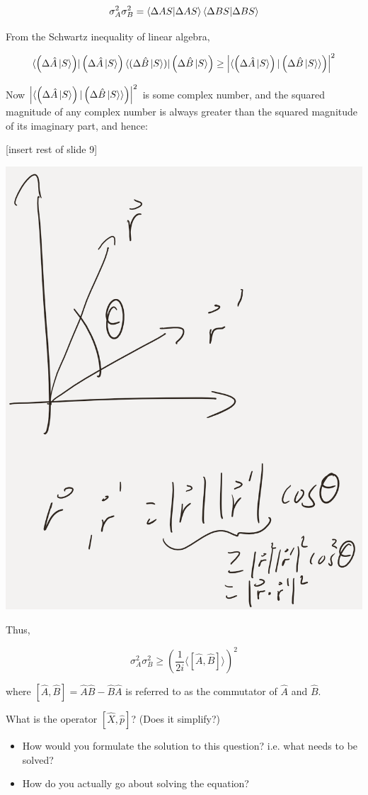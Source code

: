 \documentclass{article}
\begin{document}
$$\sigma_A^2 \sigma_B^2 = \braket{\Delta AS|\Delta AS} \braket{\Delta BS| \Delta BS}$$

From the Schwartz inequality of linear algebra, 

$$\bra{\left( \Delta \hat{A} \ket{S} \right)} \left( \Delta \hat{A} \ket{S} \right) \bra{(\Delta \hat{B} \ket{S})} \left( \Delta \hat{B} \ket{S} \right) \geq \left| \langle \left( \Delta \hat{A} \ket{S} \right) | \left( \Delta \hat{B} \ket{S} \rangle \right)  \right|^2$$

Now $\left| \langle \left( \Delta \hat{A} \ket{S} \right) | \left( \Delta \hat{B} \ket{S} \rangle \right)  \right|^2$ is some complex number, and the squared magnitude of any complex number is always greater than the squared magnitude of its imaginary part, and hence:

[insert rest of slide 9]

\includegraphics[width = 0.5 \textwidth]{Lecture16/1.png}

Thus, 

$$\sigma_A^2 \sigma_B^2 \geq \left( \frac{1}{2i} \langle \left[ \hat{A}, \hat{B} \right] \rangle \right)^2$$

where $[\hat{A}, \hat{B}] = \hat{A} \hat{B} - \hat{B} \hat{A}$ is referred to as the commutator of $\hat{A}$ and $\hat{B}$. 


What is the operator $[\hat{X}, \hat{p}]$? (Does it simplify?)

\begin{itemize}
    \item How would you formulate the solution to this question? i.e. what needs to be solved?
    \item How do you actually go about solving the equation?
\end{itemize}
\end{document}
